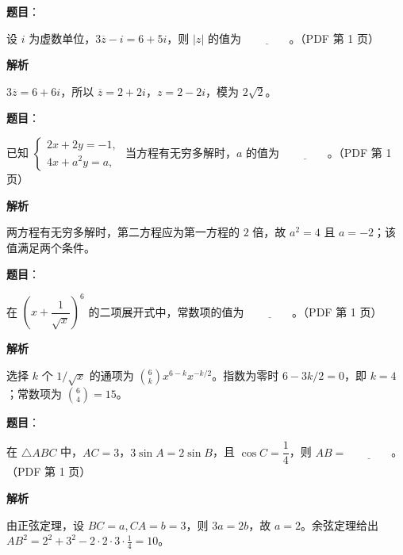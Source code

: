 \begin{answer}

\textbf{题目}：

设 $i$ 为虚数单位，$3\overline z-i=6+5i$，则 $|z|$ 的值为 $\underline{\qquad\qquad}$。（PDF 第 1 页）

\textbf{解析}

$3\overline z=6+6i$，所以 $\overline z=2+2i$，$z=2-2i$，模为 $2\sqrt2$。


\end{answer}
\begin{answer}

\textbf{题目}：

已知 $\begin{cases}2x+2y=-1,\\4x+a^2y=a,\end{cases}$ 当方程有无穷多解时，$a$ 的值为 $\underline{\qquad\qquad}$。（PDF 第 1 页）

\textbf{解析}

两方程有无穷多解时，第二方程应为第一方程的 $2$ 倍，故 $a^2=4$ 且 $a=-2$；该值满足两个条件。


\end{answer}
\begin{answer}

\textbf{题目}：

在 $\left(x+\dfrac{1}{\sqrt{x}}\right)^6$ 的二项展开式中，常数项的值为 $\underline{\qquad\qquad}$。（PDF 第 1 页）

\textbf{解析}

选择 $k$ 个 $1/\sqrt{x}$ 的通项为 $\binom6k x^{6-k}x^{-k/2}$。指数为零时 $6-3k/2=0$，即 $k=4$；常数项为 $\binom64=15$。


\end{answer}
\begin{answer}

\textbf{题目}：

在 $\triangle ABC$ 中，$AC=3$，$3\sin A=2\sin B$，且 $\cos C=\dfrac14$，则 $AB=\underline{\qquad\qquad}$。（PDF 第 1 页）

\textbf{解析}

由正弦定理，设 $BC=a,CA=b=3$，则 $3a=2b$，故 $a=2$。余弦定理给出 $AB^2=2^2+3^2-2\cdot2\cdot3\cdot\frac14=10$。


\end{answer}
